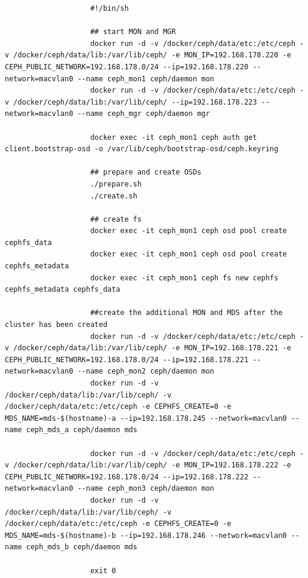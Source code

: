 \documentclass[titlepage, a4paper, 11pt]{scrartcl}
\begin{document}
                \begin{lstlisting}
                    #!/bin/sh

                    ## start MON and MGR
                    docker run -d -v /docker/ceph/data/etc:/etc/ceph -v /docker/ceph/data/lib:/var/lib/ceph/ -e MON_IP=192.168.178.220 -e CEPH_PUBLIC_NETWORK=192.168.178.0/24 --ip=192.168.178.220 --network=macvlan0 --name ceph_mon1 ceph/daemon mon
                    docker run -d -v /docker/ceph/data/etc:/etc/ceph -v /docker/ceph/data/lib:/var/lib/ceph/ --ip=192.168.178.223 --network=macvlan0 --name ceph_mgr ceph/daemon mgr

                    docker exec -it ceph_mon1 ceph auth get client.bootstrap-osd -o /var/lib/ceph/bootstrap-osd/ceph.keyring

                    ## prepare and create OSDs
                    ./prepare.sh
                    ./create.sh

                    ## create fs
                    docker exec -it ceph_mon1 ceph osd pool create cephfs_data
                    docker exec -it ceph_mon1 ceph osd pool create cephfs_metadata
                    docker exec -it ceph_mon1 ceph fs new cephfs cephfs_metadata cephfs_data

                    ##create the additional MON and MDS after the cluster has been created
                    docker run -d -v /docker/ceph/data/etc:/etc/ceph -v /docker/ceph/data/lib:/var/lib/ceph/ -e MON_IP=192.168.178.221 -e CEPH_PUBLIC_NETWORK=192.168.178.0/24 --ip=192.168.178.221 --network=macvlan0 --name ceph_mon2 ceph/daemon mon
                    docker run -d -v /docker/ceph/data/lib:/var/lib/ceph/ -v /docker/ceph/data/etc:/etc/ceph -e CEPHFS_CREATE=0 -e MDS_NAME=mds-$(hostname)-a --ip=192.168.178.245 --network=macvlan0 --name ceph_mds_a ceph/daemon mds

                    docker run -d -v /docker/ceph/data/etc:/etc/ceph -v /docker/ceph/data/lib:/var/lib/ceph/ -e MON_IP=192.168.178.222 -e CEPH_PUBLIC_NETWORK=192.168.178.0/24 --ip=192.168.178.222 --network=macvlan0 --name ceph_mon3 ceph/daemon mon
                    docker run -d -v /docker/ceph/data/lib:/var/lib/ceph/ -v /docker/ceph/data/etc:/etc/ceph -e CEPHFS_CREATE=0 -e MDS_NAME=mds-$(hostname)-b --ip=192.168.178.246 --network=macvlan0 --name ceph_mds_b ceph/daemon mds

                    exit 0
                \end{lstlisting}
\end{document}
